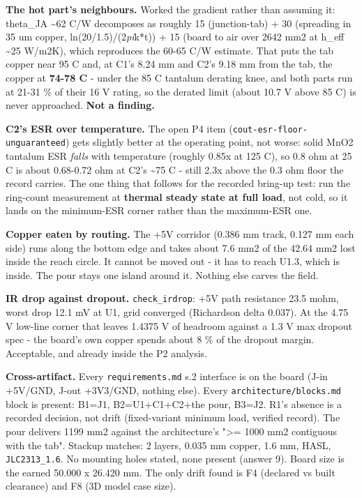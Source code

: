 \documentclass[11pt,a4paper]{article}
\begin{document}
\textbf{The hot part's neighbours.} Worked the gradient rather than assuming it: theta\_JA \textasciitilde{}62 C/W decomposes as roughly 15 (junction-tab) + 30 (spreading in 35 um copper, ln(20/1.5)/(2\emph{pi}k{*}t)) + 15 (board to air over 2642 mm2 at h\_eff \textasciitilde{}25 W/m2K), which reproduces the 60-65 C/W estimate. That puts the tab copper near 95 C and, at C1's 8.24 mm and C2's 9.18 mm from the tab, the copper at \textbf{74-78 C} - under the 85 C tantalum derating knee, and both parts run at 21-31 \% of their 16 V rating, so the derated limit (about 10.7 V above 85 C) is never approached. \textbf{Not a finding.}

\textbf{C2's ESR over temperature.} The open P4 item (\texttt{cout-esr-floor-unguaranteed}) gets slightly better at the operating point, not worse: solid MnO2 tantalum ESR \emph{falls} with temperature (roughly 0.85x at 125 C), so 0.8 ohm at 25 C is about 0.68-0.72 ohm at C2's \textasciitilde{}75 C - still 2.3x above the 0.3 ohm floor the record carries. The one thing that follows for the recorded bring-up test: run the ring-count measurement at \textbf{thermal steady state at full load}, not cold, so it lands on the minimum-ESR corner rather than the maximum-ESR one.

\textbf{Copper eaten by routing.} The +5V corridor (0.386 mm track, 0.127 mm each side) runs along the bottom edge and takes about 7.6 mm2 of the 42.64 mm2 lost inside the reach circle. It cannot be moved out - it has to reach U1.3, which is inside. The pour stays one island around it. Nothing else carves the field.

\textbf{IR drop against dropout.} \texttt{check\_irdrop}: +5V path resistance 23.5 mohm, worst drop 12.1 mV at U1, grid converged (Richardson delta 0.037). At the 4.75 V low-line corner that leaves 1.4375 V of headroom against a 1.3 V max dropout spec - the board's own copper spends about 8 \% of the dropout margin. Acceptable, and already inside the P2 analysis.

\textbf{Cross-artifact.} Every \texttt{requirements.md} s.2 interface is on the board (J-in +5V/GND, J-out +3V3/GND, nothing else). Every \texttt{architecture/blocks.md} block is present: B1=J1, B2=U1+C1+C2+the pour, B3=J2. R1's absence is a recorded decision, not drift (fixed-variant minimum load, verified record). The pour delivers 1199 mm2 against the architecture's "\textgreater{}= 1000 mm2 contiguous with the tab". Stackup matches: 2 layers, 0.035 mm copper, 1.6 mm, HASL, \texttt{JLC2313\_1.6}. No mounting holes stated, none present (answer 9). Board size is the earned 50.000 x 26.420 mm. The only drift found is F4 (declared vs built clearance) and F8 (3D model case size).
\end{document}
